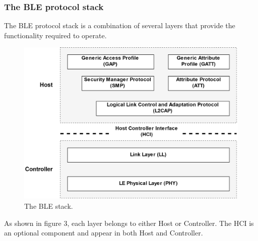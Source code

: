 \subsubsection{The BLE protocol stack}
\justify
The BLE protocol stack is a combination of several layers that provide the 
functionality required to operate. 
\begin{figure}[H]
    \centering
    \includegraphics[scale=0.6]{figure/figure03_ble_stack.png}
    \caption{The BLE stack.}
\end{figure}
\justify
As shown in figure 3, each layer belongs to either Host or Controller. 
The HCI is an optional component and appear in both Host and Controller.
